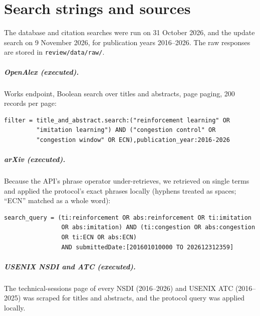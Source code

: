 \chapter{Search strings and sources}
\label{app:search}

The database and citation searches were run on 31 October 2026, and the update search on 9 November 2026, for publication years 2016--2026. The raw responses are stored in \texttt{review/data/raw/}.

\paragraph{OpenAlex (executed).} Works endpoint, Boolean search over titles and abstracts, page paging, 200 records per page:
\begin{small}
\begin{verbatim}
filter = title_and_abstract.search:("reinforcement learning" OR
         "imitation learning") AND ("congestion control" OR
         "congestion window" OR ECN),publication_year:2016-2026
\end{verbatim}
\end{small}

\paragraph{arXiv (executed).} Because the API's phrase operator under-retrieves, we retrieved on single terms and applied the protocol's exact phrases locally (hyphens treated as spaces; ``ECN'' matched as a whole word):
\begin{small}
\begin{verbatim}
search_query = (ti:reinforcement OR abs:reinforcement OR ti:imitation
                OR abs:imitation) AND (ti:congestion OR abs:congestion
                OR ti:ECN OR abs:ECN)
                AND submittedDate:[201601010000 TO 202612312359]
\end{verbatim}
\end{small}

\paragraph{USENIX NSDI and ATC (executed).} The technical-sessions page of every NSDI (2016--2026) and USENIX ATC (2016--2025) was scraped for titles and abstracts, and the protocol query was applied locally.

